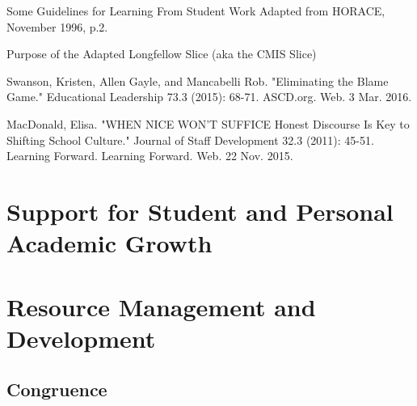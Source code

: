 \documentclass{report}
\begin{document}
\begin{evidence}
\item Some Guidelines for Learning From Student Work Adapted from HORACE, November 1996, p.2. 
\item Purpose of the Adapted Longfellow Slice (aka the CMIS Slice)
\item Swanson, Kristen, Allen Gayle, and Mancabelli Rob. "Eliminating the Blame Game." Educational Leadership 73.3 (2015): 68-71. ASCD.org. Web. 3 Mar. 2016.
\item MacDonald, Elisa. "WHEN NICE WON’T SUFFICE Honest Discourse Is Key to Shifting School Culture." Journal of Staff Development 32.3 (2011): 45-51. Learning Forward. Learning Forward. Web. 22 Nov. 2015.
\end{evidence}
\section{Support for Student and Personal Academic Growth}
\section{Resource Management and Development}
\subsection{Congruence}


\end{document}
